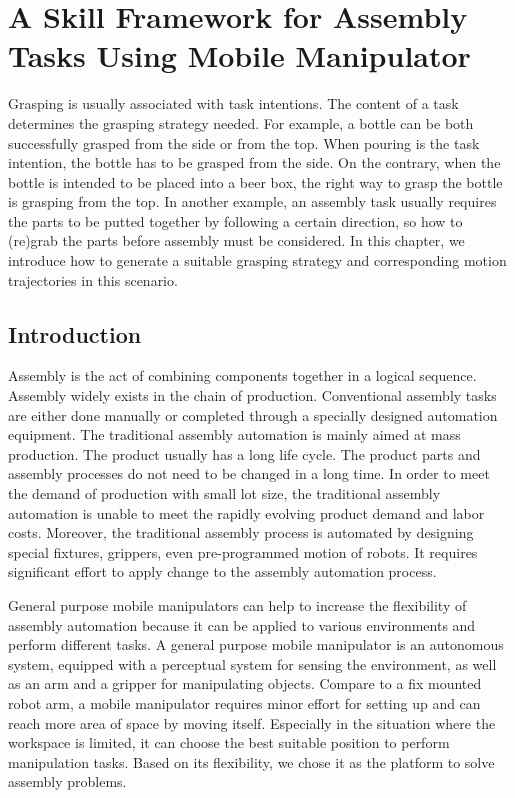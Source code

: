 \chapter{A Skill Framework for Assembly Tasks Using Mobile Manipulator} 
\label{chapter4}
Grasping is usually associated with task intentions. The content of a task determines the grasping strategy needed.  For example, a bottle can be both successfully grasped from the side or from the top. When pouring is the task intention, the bottle has to be grasped from the side.  On the contrary, when the bottle is intended to be placed into a beer box, the right way to grasp the bottle is grasping from the top. In another example, an assembly task usually requires the parts to be putted together by following a certain direction, so how to (re)grab the parts before assembly must be considered. In this chapter, we introduce how to generate a suitable grasping strategy and corresponding motion trajectories in this scenario.

\section{Introduction}
Assembly is the act of combining components together in a logical sequence. Assembly widely exists in the chain of production. Conventional assembly tasks are either done manually or completed through a specially designed automation equipment. The traditional assembly automation is mainly aimed at mass production. The product usually has a long life cycle. The product parts and assembly processes do not need to be changed in a long time.  In order to meet the demand of production with small lot size, the traditional assembly automation is unable to meet the rapidly evolving product demand and labor costs. Moreover, the traditional assembly process is automated by designing special fixtures, grippers, even pre-programmed motion of robots. It requires significant effort to apply change to the assembly automation process. 

General purpose mobile manipulators can help to increase the flexibility of assembly automation because it can be applied to various environments and perform different tasks. A general purpose mobile manipulator is an autonomous system, equipped with a perceptual system for sensing the environment, as well as an arm and a gripper for manipulating objects. Compare to a fix mounted robot arm, a mobile manipulator requires minor effort for setting up and can reach more area of space by moving itself. Especially in the situation where the workspace is limited, it can choose the best suitable position to perform manipulation tasks. Based on its flexibility, we chose it as the platform to solve assembly problems.


